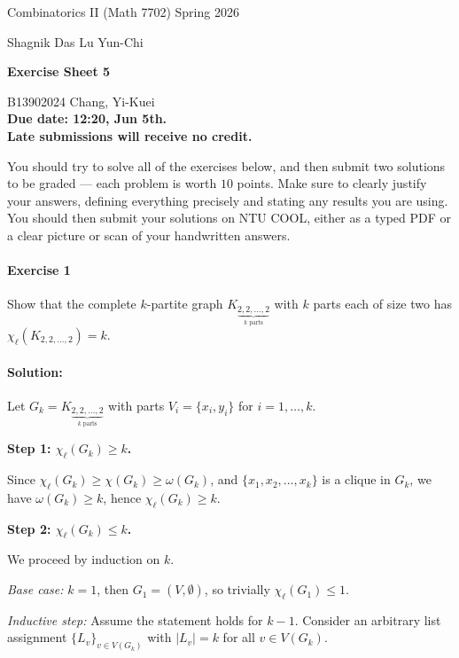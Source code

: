 \documentclass[a4paper,12pt]{article}
\newcommand{\courseTitle}{Combinatorics II (Math 7702)}
\newcommand{\semester}{Spring 2026}
\newcommand{\instructorA}{Shagnik Das}
\newcommand{\instructorB}{Lu Yun-Chi}
\newcommand{\sheetNumber}{5}
\newcommand{\dueDate}{12:20, Jun 5th.}
\newcommand{\lateWarning}{Late submissions will receive no credit.}
\newcommand{\buildtitle}[4]{
\begin{flushleft}
{\large
#1
\hfill{}
#2
\par
#3
}
\end{flushleft}
\vskip 4pt
\begin{center}
{\large\bfseries#4\par}
\end{center}
\bigskip
}
\newcommand{\card}[1]{\left| #1 \right|}
\newcommand{\chil}{\chi_{\ell}}
\begin{document}
\buildtitle{\courseTitle{}}{\semester}{\instructorA{} \hfill \instructorB{}}{Exercise Sheet \sheetNumber{}}

\vspace{-0.2in}

\begin{center}

{B13902024 Chang, Yi-Kuei \\ \bf Due date: \dueDate \\ \lateWarning}

\end{center}

\noindent You should try to solve all of the exercises below, and then submit two solutions to be graded --- each problem is worth $10$ points. Make sure to clearly justify your answers, defining everything precisely and stating any results you are using. You should then submit your solutions on NTU COOL, either as a typed PDF or a clear picture or scan of your handwritten answers.

\paragraph{Exercise 1}  Show that the complete $k$-partite graph $K_{\underbrace{2,2,\hdots,2}_{k \textrm{ parts}}}$ with $k$ parts each of size two has $\chil(K_{2,2,\hdots,2}) = k$.

\paragraph{Solution:}

Let $G_k = K_{\underbrace{2,2,\hdots,2}_{k \text{ parts} }}$ with parts $V_i = \{x_i, y_i\}$ for $i = 1, \ldots, k$.

\medskip
\noindent\textbf{Step 1: $\chil(G_k) \geq k$.}

Since $\chil(G_k) \geq \chi(G_k) \geq \omega(G_k)$, and $\{x_1, x_2, \ldots, x_k\}$ is a clique in $G_k$, we have $\omega(G_k) \geq k$, hence $\chil(G_k) \geq k$.

\medskip
\noindent\textbf{Step 2: $\chil(G_k) \leq k$.}

We proceed by induction on $k$.

\textit{Base case:} $k = 1$, then $G_1 = (V, \emptyset)$, so trivially $\chil(G_1) \leq 1$.

\textit{Inductive step:} Assume the statement holds for $k-1$. Consider an arbitrary list assignment $\{L_v\}_{v \in V(G_k)}$ with $\card{L_v} = k$ for all $v \in V(G_k)$.
\end{document}
